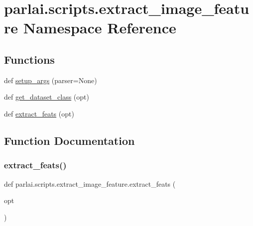 \hypertarget{namespaceparlai_1_1scripts_1_1extract__image__feature}{}\section{parlai.\+scripts.\+extract\+\_\+image\+\_\+feature Namespace Reference}
\label{namespaceparlai_1_1scripts_1_1extract__image__feature}
\subsection*{Functions}
\begin{DoxyCompactItemize}
\item 
def \hyperlink{namespaceparlai_1_1scripts_1_1extract__image__feature_ab634fcc65758e30deaf92980edcc20bd}{setup\+\_\+args} (parser=None)
\item 
def \hyperlink{namespaceparlai_1_1scripts_1_1extract__image__feature_a4fa5d8aef45056034f4898531a0f9967}{get\+\_\+dataset\+\_\+class} (opt)
\item 
def \hyperlink{namespaceparlai_1_1scripts_1_1extract__image__feature_a6e3b12d361756ec79fbd44abd185387b}{extract\+\_\+feats} (opt)
\end{DoxyCompactItemize}


\subsection{Function Documentation}
\mbox{\label{namespaceparlai_1_1scripts_1_1extract__image__feature_a6e3b12d361756ec79fbd44abd185387b}} 
\subsubsection{\texorpdfstring{extract\+\_\+feats()}{extract\_feats()}}
{\footnotesize\ttfamily def parlai.\+scripts.\+extract\+\_\+image\+\_\+feature.\+extract\+\_\+feats (\begin{DoxyParamCaption}\item[{}]{opt }\end{DoxyParamCaption})}



